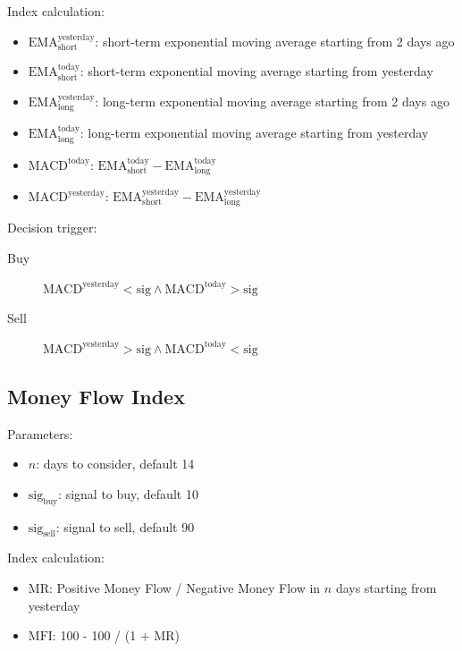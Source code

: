\documentclass{article}
\begin{document}
Index calculation:
\begin{itemize}
    \item $\text{EMA}_{\text{short}}^{\text{yesterday}}$: short-term exponential moving average starting from 2 days ago
    \item $\text{EMA}_{\text{short}}^{\text{today}}$: short-term exponential moving average starting from yesterday
    \item $\text{EMA}_{\text{long}}^{\text{yesterday}}$: long-term exponential moving average starting from 2 days ago
    \item $\text{EMA}_{\text{long}}^{\text{today}}$: long-term exponential moving average starting from yesterday
    \item $\text{MACD}^{\text{today}}$: $\text{EMA}_{\text{short}}^{\text{today}} - \text{EMA}_{\text{long}}^{\text{today}}$
    \item $\text{MACD}^{\text{yesterday}}$: $\text{EMA}_{\text{short}}^{\text{yesterday}} - \text{EMA}_{\text{long}}^{\text{yesterday}}$
\end{itemize}

Decision trigger:
\begin{description}
    \item[Buy] $\text{MACD}^{\text{yesterday}} < \text{sig} \land \text{MACD}^{\text{today}} > \text{sig}$
    \item[Sell] $\text{MACD}^{\text{yesterday}} > \text{sig} \land \text{MACD}^{\text{today}} < \text{sig}$
\end{description}


\subsection{Money Flow Index}

Parameters\cite{stock-market-prediction-model-using-TPWS}:
\begin{itemize}
    \item $n$: days to consider, default 14
    \item $\text{sig}_{\text{buy}}$: signal to buy, default 10
    \item $\text{sig}_{\text{sell}}$: signal to sell, default 90
\end{itemize}

Index calculation:
\begin{itemize}
    \item $\text{MR}$: Positive Money Flow / Negative Money Flow in $n$ days starting from yesterday
    \item $\text{MFI}$: 100 - 100 / (1 + $\text{MR}$)
\end{itemize}
\end{document}
